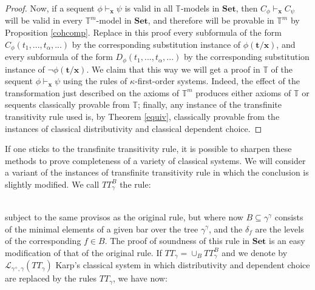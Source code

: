 \documentclass[a4paper,11pt]{article}
\theoremstyle{plain}
\theoremstyle{plain}
\theoremstyle{remark}
\newcommand{\alg}[1]{\ensuremath{\mathbf{#1}}}
\newcommand{\Sets}{\ensuremath{\mathbf{Set}}}
\newcommand{\theory}{\ensuremath{\mathbb{T}}}
\begin{document}
\begin{proof}
Now, if a sequent $\phi \vdash_{\alg{x}} \psi$ is valid in all $\theory$-models in \Sets, then $C_{\phi}\vdash_{\alg{x}}C_{\psi}$ will be valid in every $\theory^m$-model in \Sets, and therefore will be provable in $\theory^m$ by Proposition \ref{cohcomp}. Replace in this proof every subformula of the form $C_{\phi}(t_1, ..., t_{\alpha}, ...)$ by the corresponding substitution instance of $\phi(\alg{t}/\alg{x})$, and every subformula of the form $D_{\phi}(t_1, ..., t_{\alpha}, ...)$ by the corresponding substitution instance of $\neg \phi(\alg{t}/\alg{x})$. We claim that this way we will get a proof in $\theory$ of the sequent $\phi \vdash_{\alg{x}} \psi$ using the rules of $\kappa$-first-order systems. Indeed, the effect of the transformation just described on the axioms of $\theory^m$ produces either axioms of $\theory$ or sequents classically provable from $\theory$; finally, any instance of the transfinite transitivity rule used is, by Theorem \ref{equiv}, classically provable from the instances of classical distributivity and classical dependent choice.
\end{proof}

If one sticks to the transfinite transitivity rule, it is possible to sharpen these methods to prove completeness of a variety of classical systems. We will consider a variant of the instances of transfinite transitivity rule in which the conclusion is slightly modified. We call $TT_\gamma^B$ the rule:

\begin{mathpar}
\end{mathpar}
\\
subject to the same provisos as the original rule, but where now $B \subseteq \gamma^{\gamma}$ consists of the minimal elements of a given bar over the tree $\gamma^{\gamma}$, and the $\delta_f$ are the levels of the corresponding $f \in B$. The proof of soundness of this rule in $\Sets$ is an easy modification of that of the original rule. If $TT_{\gamma}=\cup_{B}TT_{\gamma}^B$ and we denote by $\mathcal{L}_{\gamma^+, \gamma}(TT_{\gamma})$ Karp's classical system in which distributivity and dependent choice are replaced by the rules $TT_{\gamma}$, we have now:
\end{document}
